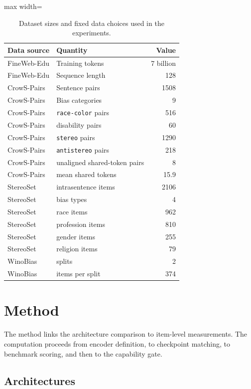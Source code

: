 \documentclass[sigconf,natbib=true,anonymous=true]{acmart}
\begin{document}
\begin{table}[t]
\centering
\caption{Dataset sizes and fixed data choices used in the experiments.}
\label{tab:datastats}
\footnotesize
\begin{adjustbox}{max width=\columnwidth}
\begin{tabular}{llr}
\toprule
Data source & Quantity & Value \\
\midrule
FineWeb-Edu & Training tokens & 7 billion \\
FineWeb-Edu & Sequence length & 128 \\
CrowS-Pairs & Sentence pairs & 1508 \\
CrowS-Pairs & Bias categories & 9 \\
CrowS-Pairs & \texttt{race-color} pairs & 516 \\
CrowS-Pairs & disability pairs & 60 \\
CrowS-Pairs & \texttt{stereo} pairs & 1290 \\
CrowS-Pairs & \texttt{antistereo} pairs & 218 \\
CrowS-Pairs & unaligned shared-token pairs & 8 \\
CrowS-Pairs & mean shared tokens & 15.9 \\
StereoSet & intrasentence items & 2106 \\
StereoSet & bias types & 4 \\
StereoSet & race items & 962 \\
StereoSet & profession items & 810 \\
StereoSet & gender items & 255 \\
StereoSet & religion items & 79 \\
WinoBias & splits & 2 \\
WinoBias & items per split & 374 \\
\bottomrule
\end{tabular}
\end{adjustbox}
\end{table}

\section{Method}
\label{sec:method}

The method links the architecture comparison to item-level measurements. The
computation proceeds from encoder definition, to checkpoint matching, to
benchmark scoring, and then to the capability gate.

\subsection{Architectures}
\end{document}
